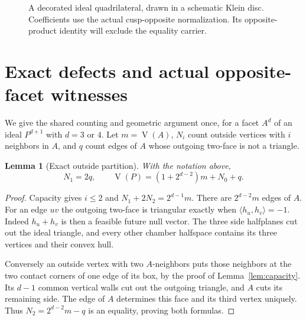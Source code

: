 \documentclass[11pt]{article}
\newtheorem{lemma}[theorem]{Lemma}
\theoremstyle{remark}
\newcommand{\VV}{\operatorname{V}}
\newcommand{\ip}[2]{\langle #1,#2\rangle}
\begin{document}
\begin{figure}[tb]
\centering
{}
\caption{A decorated ideal quadrilateral, drawn in a schematic Klein
disc. Coefficients use the actual cusp-opposite normalization. Its
opposite-product identity will exclude the equality carrier.}
\label{fig:quad}
\end{figure}

\section{Exact defects and actual opposite-facet witnesses}\label{sec:witness}

We give the shared counting and geometric argument once, for a facet
$A^d$ of an ideal $P^{d+1}$ with $d=3$ or $4$. Let $m=\VV(A)$,
$N_i$ count outside vertices with $i$ neighbors in $A$, and $q$ count
edges of $A$ whose outgoing two-face is not a triangle.

\begin{lemma}[Exact outside partition]\label{lem:partition}
With the notation above,
\begin{equation}\label{eq:partition}
 N_1=2q,\qquad
 \VV(P)=(1+2^{d-2})m+N_0+q.
\end{equation}
\end{lemma}
\begin{proof}
Capacity gives $i\le2$ and $N_1+2N_2=2^{d-1}m$.
There are $2^{d-2}m$ edges of $A$. For an edge $uv$ the outgoing
two-face is triangular exactly when $\ip{h_u}{h_v}=-1$.
Indeed $h_u+h_v$ is then a feasible future null vector. The three
side halfplanes cut out the ideal triangle, and every other chamber
halfspace contains its three vertices and their convex hull.

Conversely an outside vertex with two $A$-neighbors puts those
neighbors at the two contact corners of one edge of its box, by the
proof of Lemma~\ref{lem:capacity}. Its $d-1$ common vertical walls
cut out the outgoing triangle, and $A$ cuts its remaining side.
The edge of $A$ determines this face and its third vertex uniquely.
Thus $N_2=2^{d-2}m-q$ is an equality, proving both formulas.
\end{proof}
\end{document}
